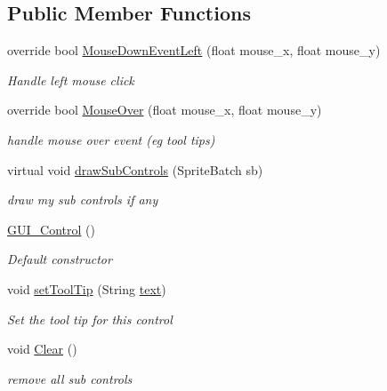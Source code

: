 \subsection*{Public Member Functions}
\begin{DoxyCompactItemize}
\item 
override bool \mbox{\hyperlink{class_r_c___framework_1_1_g_u_i___control_a005e7f109afd21abd6576fdf70212af5}{Mouse\+Down\+Event\+Left}} (float mouse\+\_\+x, float mouse\+\_\+y)
\begin{DoxyCompactList}\small\item\em Handle left mouse click \end{DoxyCompactList}\item 
override bool \mbox{\hyperlink{class_r_c___framework_1_1_g_u_i___control_ad5f72ceb3149305ce0a2891feff951a0}{Mouse\+Over}} (float mouse\+\_\+x, float mouse\+\_\+y)
\begin{DoxyCompactList}\small\item\em handle mouse over event (eg tool tips) \end{DoxyCompactList}\item 
virtual void \mbox{\hyperlink{class_r_c___framework_1_1_g_u_i___control_a5e2a0dbd0e76b4753ee7e33c5873f099}{draw\+Sub\+Controls}} (Sprite\+Batch sb)
\begin{DoxyCompactList}\small\item\em draw my sub controls if any \end{DoxyCompactList}\item 
\mbox{\hyperlink{class_r_c___framework_1_1_g_u_i___control_aba58c5937d3c44703c5b4c7be4701a47}{G\+U\+I\+\_\+\+Control}} ()
\begin{DoxyCompactList}\small\item\em Default constructor \end{DoxyCompactList}\item 
void \mbox{\hyperlink{class_r_c___framework_1_1_g_u_i___control_ae53955f2d8f4a2be9dffbfabfe0901d7}{set\+Tool\+Tip}} (String \mbox{\hyperlink{class_r_c___framework_1_1_r_c___renderable_a255c5d9294a719e56855890f3535d129}{text}})
\begin{DoxyCompactList}\small\item\em Set the tool tip for this control \end{DoxyCompactList}\item 
void \mbox{\hyperlink{class_r_c___framework_1_1_g_u_i___control_a55f2748c142671a1e73a188204768f93}{Clear}} ()
\begin{DoxyCompactList}\small\item\em remove all sub controls \end{DoxyCompactList}\item 

\end{DoxyCompactItemize}

